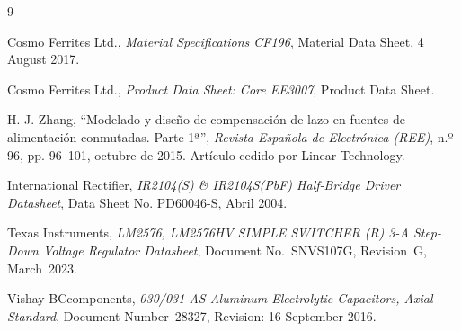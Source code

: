 \begin{thebibliography}{9}

Cosmo Ferrites Ltd.,
\textit{Material Specifications CF196},
Material Data Sheet,
4 August 2017.

Cosmo Ferrites Ltd.,
\textit{Product Data Sheet: Core EE3007},
Product Data Sheet.

H. J. Zhang,
``Modelado y diseño de compensación de lazo en fuentes de alimentación conmutadas. Parte 1ª'',
\textit{Revista Española de Electrónica (REE)},
n.º 96, pp. 96--101, octubre de 2015.
Artículo cedido por Linear Technology.

International Rectifier,
\textit{IR2104(S) \& IR2104S(PbF) Half-Bridge Driver Datasheet},
Data Sheet No. PD60046-S, Abril 2004.

Texas Instruments,
\emph{LM2576, LM2576HV SIMPLE SWITCHER (R) 3-A Step-Down Voltage Regulator Datasheet},
Document No.~SNVS107G,
Revision~G, March~2023.

Vishay BCcomponents,
\textit{030/031 AS Aluminum Electrolytic Capacitors, Axial Standard},
Document Number~28327,
Revision: 16 September 2016.

\end{thebibliography}